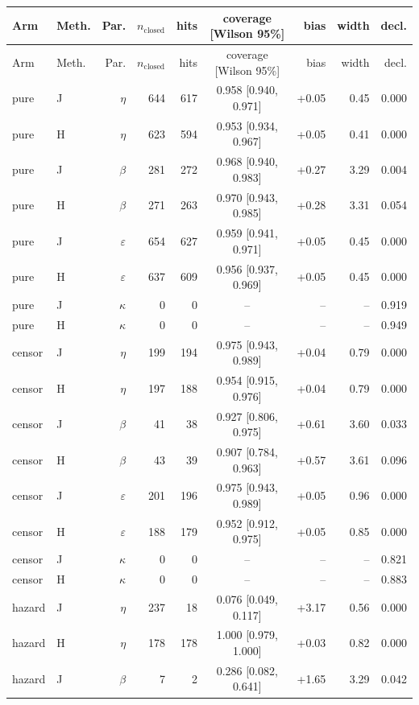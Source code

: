\begin{longtable}{llrrrcrrr}
\toprule
Arm & Meth. & Par. & $n_{\mathrm{closed}}$ & hits & coverage [Wilson 95\%] & bias & width & decl. \\
\midrule
\endfirsthead
\toprule
Arm & Meth. & Par. & $n_{\mathrm{closed}}$ & hits & coverage [Wilson 95\%] & bias & width & decl. \\
\midrule
\endhead
\bottomrule
\endfoot
pure & J & $\eta$ & 644 & 617 & 0.958 [0.940, 0.971] & +0.05 & 0.45 & 0.000 \\
pure & H & $\eta$ & 623 & 594 & 0.953 [0.934, 0.967] & +0.05 & 0.41 & 0.000 \\
pure & J & $\beta$ & 281 & 272 & 0.968 [0.940, 0.983] & +0.27 & 3.29 & 0.004 \\
pure & H & $\beta$ & 271 & 263 & 0.970 [0.943, 0.985] & +0.28 & 3.31 & 0.054 \\
pure & J & $\varepsilon$ & 654 & 627 & 0.959 [0.941, 0.971] & +0.05 & 0.45 & 0.000 \\
pure & H & $\varepsilon$ & 637 & 609 & 0.956 [0.937, 0.969] & +0.05 & 0.45 & 0.000 \\
pure & J & $\kappa$ & 0 & 0 & -- & -- & -- & 0.919 \\
pure & H & $\kappa$ & 0 & 0 & -- & -- & -- & 0.949 \\
\midrule
censor & J & $\eta$ & 199 & 194 & 0.975 [0.943, 0.989] & +0.04 & 0.79 & 0.000 \\
censor & H & $\eta$ & 197 & 188 & 0.954 [0.915, 0.976] & +0.04 & 0.79 & 0.000 \\
censor & J & $\beta$ & 41 & 38 & 0.927 [0.806, 0.975] & +0.61 & 3.60 & 0.033 \\
censor & H & $\beta$ & 43 & 39 & 0.907 [0.784, 0.963] & +0.57 & 3.61 & 0.096 \\
censor & J & $\varepsilon$ & 201 & 196 & 0.975 [0.943, 0.989] & +0.05 & 0.96 & 0.000 \\
censor & H & $\varepsilon$ & 188 & 179 & 0.952 [0.912, 0.975] & +0.05 & 0.85 & 0.000 \\
censor & J & $\kappa$ & 0 & 0 & -- & -- & -- & 0.821 \\
censor & H & $\kappa$ & 0 & 0 & -- & -- & -- & 0.883 \\
\midrule
hazard & J & $\eta$ & 237 & 18 & 0.076 [0.049, 0.117] & +3.17 & 0.56 & 0.000 \\
hazard & H & $\eta$ & 178 & 178 & 1.000 [0.979, 1.000] & +0.03 & 0.82 & 0.000 \\
hazard & J & $\beta$ & 7 & 2 & 0.286 [0.082, 0.641] & +1.65 & 3.29 & 0.042 \\

\end{longtable}
